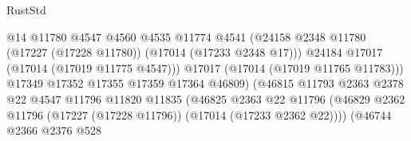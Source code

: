 \begin{lexlean}{RustStd}
\begin{coremodule}
{\begin{coremodule}
{{{{{{{{{{{{{{{{{{{{{{{{{{{{{{{{{{{{{{{{{{{{{{{{{{{{{{{                                                  @14
                                                  @11780
                                                  @4547
                                                  @4560
                                                  @4535
                                                  @11774
                                                  @4541
                                                  (@24158
                                                    @2348
                                                    @11780
                                                    (@17227 (@17228 @11780))
                                                    (@17014 (@17233 @2348 @17)))
                                                  @24184
                                                  @17017
                                                  (@17014 (@17019 @11775 @4547)))
                                                @17017
                                                (@17014 (@17019 @11765 @11783)))
                                              @17349
                                              @17352
                                              @17355
                                              @17359
                                              @17364
                                              @46809)
                                            (@46815
                                              @11793
                                              @2363
                                              @2378
                                              @22
                                              @4547
                                              @11796
                                              @11820
                                              @11835
                                              (@46825
                                                @2363
                                                @22
                                                @11796
                                                (@46829
                                                  @2362
                                                  @11796
                                                  (@17227 (@17228 @11796))
                                                  (@17014 (@17233 @2362 @22))))
                                              (@46744
                                                @2366
                                                @2376
                                                @528
}}}}}}}}}}}}}}}}}}}}}}}}}}}}}}}}}}}}}}}}}}}}}}}}}}}}}}}
\end{coremodule}}
\end{coremodule}
\end{lexlean}
